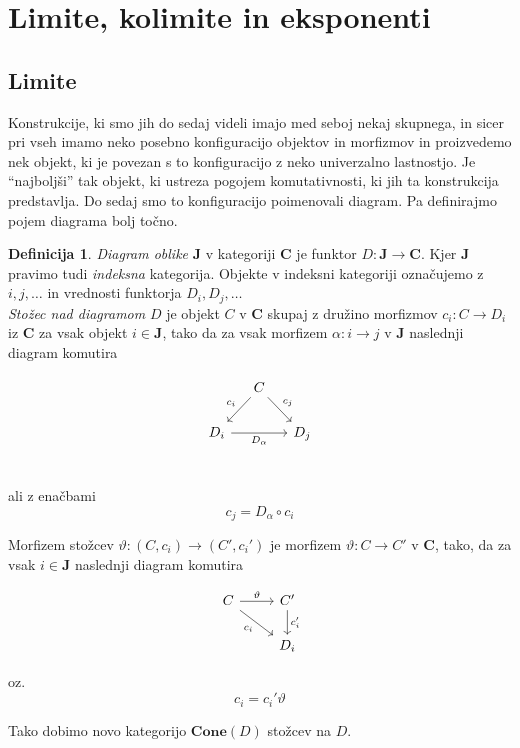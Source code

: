\documentclass[12pt,a4paper]{book}
\theoremstyle{definition}
\newtheorem{definicija}{Definicija}[chapter]
\theoremstyle{plain}
\theoremstyle{definition}
\theoremstyle{remark}
\newcommand{\cat}[1]{\textbf{#1}}
\begin{document}
\section{Limite, kolimite in eksponenti}


\subsection{Limite}

Konstrukcije, ki smo jih do sedaj videli imajo med seboj nekaj skupnega, in sicer pri vseh imamo neko posebno konfiguracijo objektov in morfizmov in proizvedemo nek objekt, ki je povezan s to konfiguracijo z neko univerzalno lastnostjo. Je "`najboljši"' tak objekt, ki ustreza pogojem komutativnosti, ki jih ta konstrukcija predstavlja. Do sedaj smo to konfiguracijo poimenovali diagram. Pa definirajmo pojem diagrama bolj točno.

\begin{definicija}
\textit{Diagram oblike} $\cat{J}$ v kategoriji $\cat{C}$ je funktor $D : \cat{J} \to \cat{C}$. Kjer $\cat{J}$ pravimo tudi \textit{indeksna} kategorija. Objekte v indeksni kategoriji označujemo z $i,j,\ldots$ in vrednosti funktorja $D_i,D_j,\ldots$ \\
\textit{Stožec nad diagramom} $D$ je objekt $C$ v $\cat{C}$ skupaj z družino morfizmov $c_i : C \to D_i$ iz $\cat{C}$ za vsak objekt $i \in \cat{J}$, tako da za vsak morfizem $\alpha : i \to j$ v $\cat{J}$ naslednji diagram komutira

$$\begin{tikzcd}[column sep=small]
& C \ar[dl, "c_i"'] \ar[dr, "c_j"] & \\
D_i \ar[rr, "D_\alpha"'] & & D_j \\
\end{tikzcd}$$

ali z enačbami $$c_j = D_\alpha \circ c_i$$

Morfizem stožcev $\vartheta : (C, c_i) \to (C', c_i')$ je morfizem $\vartheta : C \to C'$ v $\cat{C}$, tako, da za vsak $i \in \cat{J}$ naslednji diagram komutira

$$\begin{tikzcd}
C \ar[dr, "c_i"'] \ar[r, "\vartheta"] & C' \ar[d, "c_i'"] \\
& D_i
\end{tikzcd}$$

oz. $$c_i = c_i' \vartheta$$

Tako dobimo novo kategorijo $\cat{Cone}(D)$ stožcev na $D$.
\end{definicija}
\end{document}
